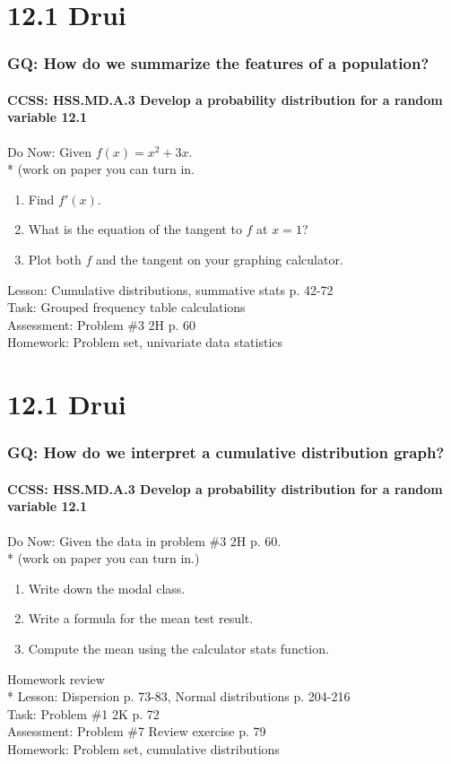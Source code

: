 \documentclass{beamer}
\begin{document}
  \section{12.1 Drui}
  \frame
  {
    \frametitle{GQ: How do we summarize the features of a population?}
    \framesubtitle{CCSS: HSS.MD.A.3 Develop a probability distribution for a random variable \qquad \alert{12.1}}

    \begin{block}{Do Now: Given $f(x)=x^2+3x$. \\*
    (work on paper you can turn in.}
    \begin{enumerate}
        \item Find $f'(x)$.
        \item What is the equation of the tangent to $f$ at $x=1$?
        \item Plot both $f$ and the tangent on your graphing calculator.
    \end{enumerate}
    \end{block}
    Lesson:  Cumulative distributions, summative stats p. 42-72\\%
    Task: Grouped frequency table calculations\\%
    Assessment: Problem \#3 2H p. 60
    \\%
    Homework: Problem set, univariate data statistics
  }


  \section{12.1 Drui}
  \frame
  {
    \frametitle{GQ: How do we interpret a cumulative distribution graph?}
    \framesubtitle{CCSS: HSS.MD.A.3 Develop a probability distribution for a random variable \qquad \alert{12.1}}

    \begin{block}{Do Now: Given the data in problem \#3 2H p. 60.\\*
    (work on paper you can turn in.)}
      \begin{enumerate}
        \item Write down the modal class.
        \item Write a formula for the mean test result.
        \item Compute the mean using the calculator stats function.
      \end{enumerate}
   \end{block}
    Homework review\\*
    Lesson:  Dispersion p. 73-83, Normal distributions p. 204-216\\%
    Task: Problem \#1 2K p. 72\\%
    Assessment: Problem \#7 Review exercise p. 79
    \\%
    Homework: Problem set, cumulative distributions
  }
\end{document}
